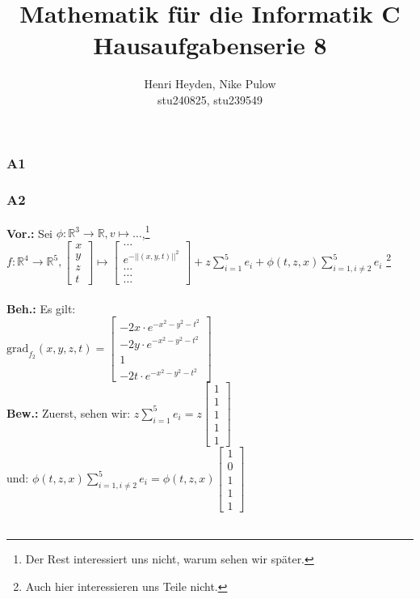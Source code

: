 \documentclass[12pt, a4paper]{article}
\title{Mathematik für die Informatik C\\Hausaufgabenserie 8}
\author{Henri Heyden, Nike Pulow \\ \small stu240825, stu239549}
\date{}
\newcommand*{\puffer}{\text{ }\text{ }\text{ }\text{ }}
\newcommand*{\gap}{\text{ }}
\newcommand*{\vor}{\textbf{Vor.:} \gap}
\newcommand*{\beh}{\textbf{Beh.:} \gap}
\newcommand*{\bew}{\textbf{Bew.:} \gap}
\newcommand*{\R}{\mathbb R}
\newcommand*{\grad}{\text{grad}}
\begin{document}
\maketitle

\doublespacing
\subsubsection*{A1}
\subsubsection*{A2}
\vor Sei \(\phi: \R^3 \rightarrow \R, v \mapsto \dots\),\footnote[1]{Der Rest interessiert uns nicht, warum sehen wir später.}\\ \singlespacing
\(f: \R^4 \rightarrow \R^5, \begin{bmatrix}
    x \\ y \\ z \\ t
\end{bmatrix} \mapsto \begin{bmatrix}
    \dots \\ e^{-||(x,y,t)||^2} \\ \dots \\ \dots \\ \dots
\end{bmatrix} + z\sum_{i=1}^{5}e_i + \phi(t,z,x)\sum_{i = 1, i \ne 2}^{5}e_i\) \gap \footnote[2]{Auch hier interessieren uns Teile nicht.} \\ \\
\beh Es gilt:\\
\puffer \(\grad_{f_2}(x,y,z,t) = \begin{bmatrix}
    -2x \cdot e^{-x^2-y^2-t^2} \\ -2y \cdot e^{-x^2-y^2-t^2} \\ 1 \\ -2t \cdot e^{-x^2-y^2-t^2}
\end{bmatrix}\) \\
\bew Zuerst, sehen wir: \(z\sum_{i=1}^{5}e_i = z\begin{bmatrix}
    1 \\ 1 \\ 1 \\ 1 \\ 1
\end{bmatrix}\) \\ und: \(\phi(t,z,x)\sum_{i = 1, i \ne 2}^{5}e_i = \phi(t,z,x)\begin{bmatrix}
    1 \\ 0 \\ 1 \\ 1 \\ 1
\end{bmatrix}\) \\ \doublespacing \pagebreak \\
\end{document}
